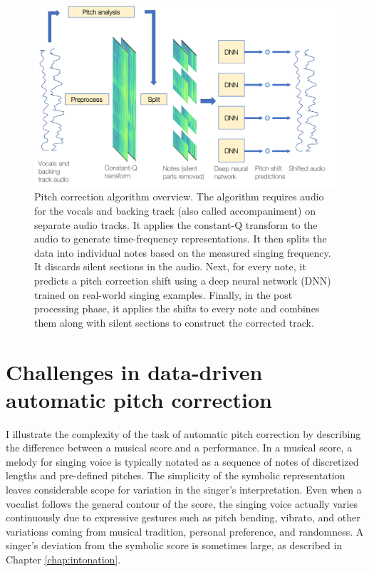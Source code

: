 \begin{figure}[t!]
    \centering
    \includegraphics[width=\columnwidth]{images/program_flow_chart.png}
    \caption{Pitch correction algorithm overview. The algorithm requires audio for the vocals and backing track (also called accompaniment) on separate audio tracks. It applies the constant-Q transform to the audio to generate time-frequency representations. It then splits the data into individual notes based on the measured singing frequency. It discards silent sections in the audio. Next, for every note, it predicts a pitch correction shift using a deep neural network (DNN) trained on real-world singing examples. Finally, in the post processing phase, it applies the shifts to every note and combines them along with silent sections to construct the corrected track. }
    \label{fig:results}
\end{figure}

\section{Challenges in data-driven automatic pitch correction}

I illustrate the complexity of the task of automatic pitch correction by describing the difference between a musical score and a performance. In a musical score, a melody for singing voice is typically notated as a sequence of notes of discretized lengths and pre-defined pitches. The simplicity of the symbolic representation leaves considerable scope for variation in the singer's interpretation. Even when a vocalist follows the general contour of the score, the singing voice actually varies continuously due to expressive gestures such as pitch bending, vibrato, and other variations coming from musical tradition, personal preference, and randomness. A singer's deviation from the symbolic score is sometimes large, as described in Chapter \ref{chap:intonation}.

